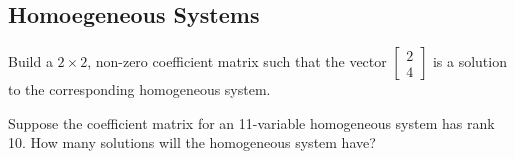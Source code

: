 \documentclass[11pt]{exam}
\begin{document}
    \vspace{20px}
    \subsection{Homoegeneous Systems}
    \begin{questions}
        \item Build a $2 \times 2$, non-zero coefficient matrix such that the vector $\begin{bmatrix}2 \\ 4\end{bmatrix}$ is a solution
        to the corresponding homogeneous system.
        \item Suppose the coefficient matrix for an 11-variable homogeneous system has rank 10. How many solutions will the homogeneous
        system have?
    \end{questions}

    \pagebreak
\end{document}
